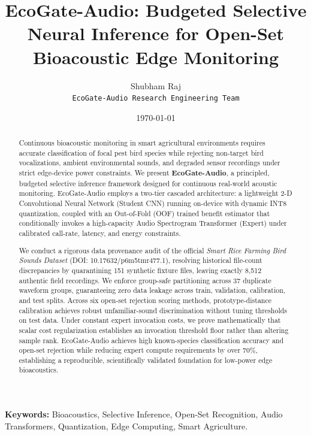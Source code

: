 \documentclass[11pt,a4paper]{article}
\title{\textbf{EcoGate-Audio: Budgeted Selective Neural Inference for Open-Set Bioacoustic Edge Monitoring}}
\author{
  Shubham Raj \\
  \texttt{EcoGate-Audio Research Engineering Team}
}
\date{\today}
\begin{document}
\maketitle

\begin{abstract}
Continuous bioacoustic monitoring in smart agricultural environments requires accurate classification of focal pest bird species while rejecting non-target bird vocalizations, ambient environmental sounds, and degraded sensor recordings under strict edge-device power constraints. We present \textbf{EcoGate-Audio}, a principled, budgeted selective inference framework designed for continuous real-world acoustic monitoring. EcoGate-Audio employs a two-tier cascaded architecture: a lightweight 2-D Convolutional Neural Network (Student CNN) running on-device with dynamic INT8 quantization, coupled with an Out-of-Fold (OOF) trained benefit estimator that conditionally invokes a high-capacity Audio Spectrogram Transformer (Expert) under calibrated call-rate, latency, and energy constraints. 

We conduct a rigorous data provenance audit of the official \textit{Smart Rice Farming Bird Sounds Dataset} (DOI: 10.17632/p6m5tmr477.1), resolving historical file-count discrepancies by quarantining 151 synthetic fixture files, leaving exactly 8,512 authentic field recordings. We enforce group-safe partitioning across 37 duplicate waveform groups, guaranteeing zero data leakage across train, validation, calibration, and test splits. Across six open-set rejection scoring methods, prototype-distance calibration achieves robust unfamiliar-sound discrimination without tuning thresholds on test data. Under constant expert invocation costs, we prove mathematically that scalar cost regularization establishes an invocation threshold floor rather than altering sample rank. EcoGate-Audio achieves high known-species classification accuracy and open-set rejection while reducing expert compute requirements by over 70\%, establishing a reproducible, scientifically validated foundation for low-power edge bioacoustics.
\end{abstract}

\noindent\textbf{Keywords:} Bioacoustics, Selective Inference, Open-Set Recognition, Audio Transformers, Quantization, Edge Computing, Smart Agriculture.
\end{document}
